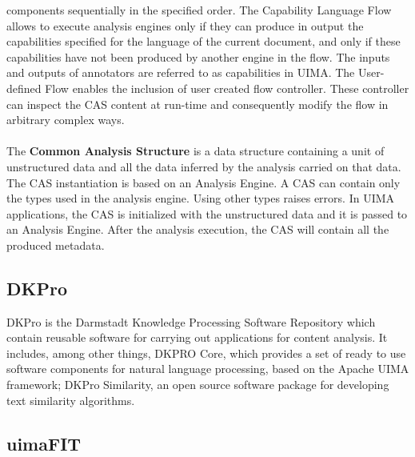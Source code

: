 \documentclass{wileysev}
\begin{document}
components sequentially in the specified order. The Capability Language Flow allows to execute analysis engines only if they can produce in output the capabilities specified for the language of the current document, and only if these capabilities have not been produced by another engine in the flow. The inputs and outputs of annotators are referred to as capabilities in UIMA. The User-defined Flow enables the inclusion of user created flow controller. These controller can inspect the CAS content at run-time and consequently modify the flow in arbitrary complex ways.\\\\
The \textbf{Common Analysis Structure} is a data structure containing a unit of unstructured data and all the data inferred by the analysis carried on that data. The CAS instantiation is based on an Analysis Engine. A CAS can contain only the types used in the analysis engine. Using other
types raises errors. In UIMA applications, the CAS is initialized with the unstructured data and it is passed to an Analysis Engine. After the analysis execution, the CAS will contain all the produced metadata.

\subsection[DKPro]{DKPro}

DKPro is the Darmstadt Knowledge Processing Software Repository which contain reusable software for carrying out applications for content analysis. It includes, among other things, DKPRO Core, which provides a set of ready to use software components for natural language processing, based on the Apache UIMA framework; DKPro Similarity, an open source software package for developing text similarity algorithms.

\subsection[uimaFIT]{uimaFIT}
\end{document}
